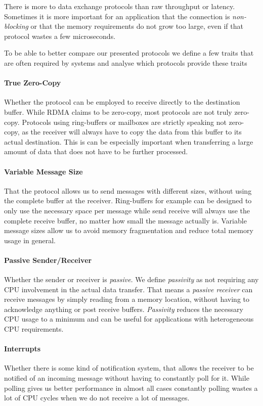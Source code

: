 There is more to data exchange protocols than raw throughput or latency. Sometimes it is more important for an application
that the connection is \emph{non-blocking} or that the memory requirements do not grow too large, even if that protocol wastes
a few microseconds.

To be able to better compare our presented protocols we define a few traits that are often required by systems and
analyse which protocols provide these traits

\paragraph{True Zero-Copy} Whether the protocol can be employed to receive directly to the destination buffer. While RDMA 
claims to be zero-copy, most protocols are not truly zero-copy. Protocols using ring-buffers or mailboxes are
strictly speaking not zero-copy, as the receiver will always have to copy the data from this buffer to its actual destination.
This is can be especially important when transferring a large amount of data that does not have to be further processed.

\paragraph{Variable Message Size} That the protocol allows us to send messages with different sizes, without using the 
complete buffer at the receiver. Ring-buffers for example can be designed to only use the necessary space per message
while send receive will always use the complete receive buffer, no matter how small the message actually is. Variable
message sizes allow us to avoid memory fragmentation and reduce total memory usage in general.

\paragraph{Passive Sender/Receiver} Whether the sender or receiver is \emph{passive}. We define \emph{passivity} as not 
requiring any CPU involvement in the actual data transfer. That means a \emph{passive receiver} can receive messages by
simply reading from a memory location, without having to acknowledge anything or post receive buffers. \emph{Passivity} 
reduces the necessary CPU usage to a minimum and can be useful for applications with heterogeneous CPU requirements.

\paragraph{Interrupts} Whether there is some kind of notification system, that allows the receiver to be notified 
of an incoming message without having to constantly poll for it. While polling gives us better performance in almost all cases
constantly polling wastes a lot of CPU cycles when we do not receive a lot of messages.

